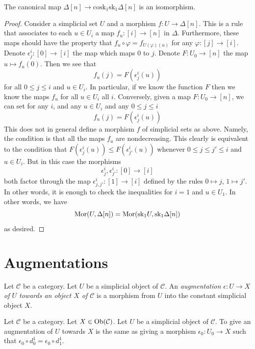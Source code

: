 \begin{lemma}
\label{lemma-simplex-cosk}
The canonical map
$\Delta[n] \to \text{cosk}_1 \text{sk}_1 \Delta[n]$
is an isomorphism.
\end{lemma}

\begin{proof}
Consider a simplicial set $U$ and a morphism
$f : U \to \Delta[n]$. This is a rule that associates
to each $u \in U_i$ a map $f_u : [i] \to [n]$ in $\Delta$.
Furthermore, these maps should have the property that
$f_u \circ \varphi = f_{U(\varphi)(u)}$ for any
$\varphi : [j] \to [i]$. Denote $\epsilon^i_j : [0] \to [i]$
the map which maps $0$ to $j$. Denote $F : U_0 \to [n]$
the map $u \mapsto f_u(0)$. Then we see that
$$
f_u(j) = F(\epsilon^i_j(u))
$$
for all $0 \leq j \leq i$ and $u \in U_i$.
In particular, if we know the function $F$
then we know the maps $f_u$ for all $u\in U_i$ all $i$.
Conversely, given a map $F : U_0 \to [n]$,
we can set for any $i$, and any $u \in U_i$
and any $0 \leq j \leq i$
$$
f_u(j) = F(\epsilon^i_j(u))
$$
This does not in general define a morphism $f$ of simplicial sets
as above. Namely, the condition is that all the maps $f_u$ are
nondecreasing. This clearly is equivalent to the condition
that $F(\epsilon^i_j(u)) \leq F(\epsilon^i_{j'}(u))$
whenever $0 \leq j \leq j' \leq i$ and $u \in U_i$. But in this
case the morphisms
$$
\epsilon^i_j, \epsilon^i_{j'} : [0] \to [i]
$$
both factor through the map
$\epsilon^i_{j, j'} : [1] \to [i]$ defined by the rules
$0 \mapsto j$, $1 \mapsto j'$.
In other words, it is enough to check the inequalities for
$i = 1$ and $u \in U_1$. In other words, we have
$$
\mathop{\mathrm{Mor}}\nolimits(U, \Delta[n])
=
\mathop{\mathrm{Mor}}\nolimits(\text{sk}_1 U, \text{sk}_1 \Delta[n])
$$
as desired.
\end{proof}



\section{Augmentations}
\label{section-augmentation}

\begin{definition}
\label{definition-augmentation}
Let $\mathcal{C}$ be a category.
Let $U$ be a simplicial object of $\mathcal{C}$.
An {\it augmentation $\epsilon : U \to X$ of
$U$ towards an object $X$ of $\mathcal{C}$}
is a morphism from $U$ into the constant simplicial
object $X$.
\end{definition}

\begin{lemma}
\label{lemma-augmentation-howto}
Let $\mathcal{C}$ be a category.
Let $X \in \mathop{\mathrm{Ob}}\nolimits(\mathcal{C})$.
Let $U$ be a simplicial object of $\mathcal{C}$.
To give an augmentation of $U$ towards $X$ is
the same as giving a morphism $\epsilon_0 : U_0 \to X$
such that $\epsilon_0 \circ d^1_0 = \epsilon_0 \circ d^1_1$.
\end{lemma}

